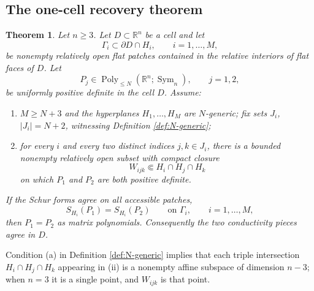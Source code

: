 \documentclass[11pt,oneside]{article}
\newtheorem{theorem}{Theorem}[section]
\newcommand{\R}{\mathbb R}
\newcommand{\Sym}{\operatorname{Sym}}
\begin{document}
\subsection{The one-cell recovery theorem}

\begin{theorem}
\label{thm:flat-cell-recovery}
Let \(n\ge3\).  Let \(D\subset\R^n\) be a cell and let
\begin{equation}
  \Gamma_i\subset \partial D\cap H_i,
  \qquad i=1,\ldots,M,
\end{equation}
be nonempty relatively open flat patches contained in the relative interiors of
flat faces of \(D\).  Let
\begin{equation}
  P_j\in\operatorname{Poly}_{\le N}(\R^n;\Sym_n),
  \qquad j=1,2,
\end{equation}
be uniformly positive definite in the cell \(D\).  Assume:
\begin{enumerate}[label=(\roman*)]
  \item \(M\ge N+3\) and the hyperplanes \(H_1,\ldots,H_M\) are
  \(N\)-generic; fix sets \(J_i\), \(|J_i|=N+2\), witnessing Definition
  \ref{def:N-generic};
  \item for every \(i\) and every two distinct indices \(j,k\in J_i\), there is
  a bounded nonempty relatively open subset with compact closure
  \begin{equation}
    W_{ijk}\Subset H_i\cap H_j\cap H_k
    \label{eq:common-triple-region}
  \end{equation}
  on which \(P_1\) and \(P_2\) are both positive definite.
\end{enumerate}
If the Schur forms agree on all accessible patches,
\begin{equation}
  S_{H_i}(P_1)=S_{H_i}(P_2)
  \qquad\text{on }\Gamma_i,
  \qquad i=1,\ldots,M,
  \label{eq:flat-cell-face-data-hypothesis}
\end{equation}
then \(P_1=P_2\) as matrix polynomials.  Consequently the two conductivity
pieces agree in \(D\).
\end{theorem}

Condition (a) in Definition \ref{def:N-generic} implies that each triple
intersection
\(H_i\cap H_j\cap H_k\) appearing in (ii) is a nonempty affine subspace of
dimension \(n-3\); when \(n=3\) it is a single point, and \(W_{ijk}\) is that
point.
\end{document}
